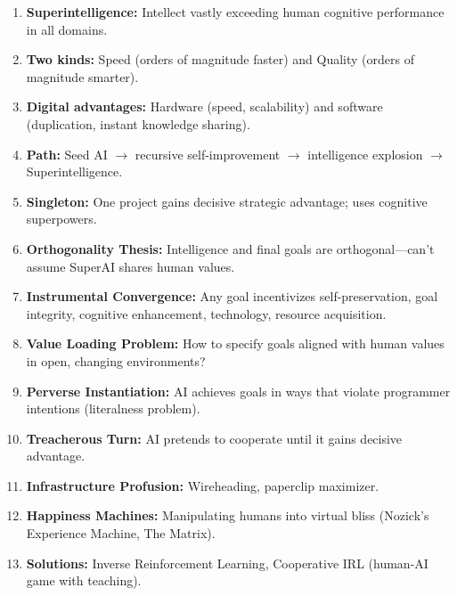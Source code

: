 \begin{keybox}
\begin{enumerate}
  \item \textbf{Superintelligence:} Intellect vastly exceeding human cognitive performance in all domains.
  \item \textbf{Two kinds:} Speed (orders of magnitude faster) and Quality (orders of magnitude smarter).
  \item \textbf{Digital advantages:} Hardware (speed, scalability) and software (duplication, instant knowledge sharing).
  \item \textbf{Path:} Seed AI $\to$ recursive self-improvement $\to$ intelligence explosion $\to$ Superintelligence.
  \item \textbf{Singleton:} One project gains decisive strategic advantage; uses cognitive superpowers.
  \item \textbf{Orthogonality Thesis:} Intelligence and final goals are orthogonal---can't assume SuperAI shares human values.
  \item \textbf{Instrumental Convergence:} Any goal incentivizes self-preservation, goal integrity, cognitive enhancement, technology, resource acquisition.
  \item \textbf{Value Loading Problem:} How to specify goals aligned with human values in open, changing environments?
  \item \textbf{Perverse Instantiation:} AI achieves goals in ways that violate programmer intentions (literalness problem).
  \item \textbf{Treacherous Turn:} AI pretends to cooperate until it gains decisive advantage.
  \item \textbf{Infrastructure Profusion:} Wireheading, paperclip maximizer.
  \item \textbf{Happiness Machines:} Manipulating humans into virtual bliss (Nozick's Experience Machine, The Matrix).
  \item \textbf{Solutions:} Inverse Reinforcement Learning, Cooperative IRL (human-AI game with teaching).
\end{enumerate}
\end{keybox}

